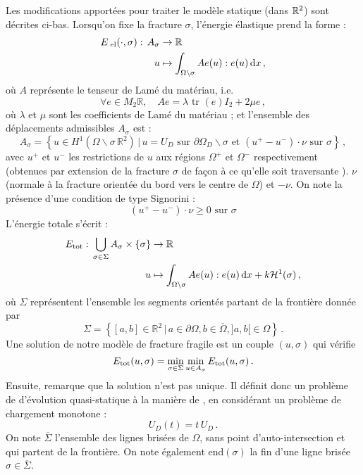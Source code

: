 Les modifications apportées pour traiter le modèle statique (dans $\mathbb{R}^2$) sont décrites ci-bas. Lorsqu'on fixe la fracture $\sigma$, l'énergie élastique prend la forme :
\begin{align*}
\eel (\cdot,\sigma): \, A_{\sigma} &\rightarrow \mathbb{R} \\
u &\mapsto \int_{\Omega \backslash \sigma} Ae(u) : e(u) \diff x \,,
\end{align*}
où $A$ représente le tenseur de Lamé du matériau, i.e.
$$
    \forall e \in M_2{\mathbb{R}}, \quad Ae = \lambda \text{ tr }(e)I_2 + 2\mu e \,,
$$ 
où $\lambda$ et $\mu$ sont les coefficients de Lamé du matériau ; et l'ensemble des déplacements admissibles $A_{\sigma}$ est :
$$
A_{\sigma} = \left\{  u \in H^1(\Omega \backslash \sigma \, \mathbb{R}^2) \, \rvert \, u=U_D \text{ sur } \partial \Omega_D \backslash \sigma \text{ et } (u^+ - u^{-}) \cdot \nu \text{ sur } \sigma \right\} \,,
$$
avec $u^{+}$ et $u^{−}$ les restrictions de $u$ aux régions $\Omega^{+}$ et $\Omega^{-}$ respectivement (obtenues par extension de la fracture $\sigma$ de façon à ce qu'elle soit traversante \parencite[p.52]{balasoiu2020halthesis}). $\nu$ (normale à la fracture orientée du bord vers le centre de $\Omega$) et $−\nu$. On note la présence d'une condition de type Signorini :
$$
(u^+ - u^{-}) \cdot \nu \geq 0 \text{  sur  } \sigma
$$
L'énergie totale s'écrit :
\begin{align*}
\etot : \,\bigcup_{\sigma \in \Sigma } A_{\sigma} \times \left\{ \sigma \right\} &\rightarrow \mathbb{R} \\
 u &\mapsto \int_{\Omega \backslash \sigma} Ae(u) : e(u) \diff x + k\mathcal{H}^1(\sigma)\,,
\end{align*}
où $\Sigma$ représentent l'ensemble les segments orientés partant de la frontière donnée par 
$$
\Sigma = \left\{ [a,b] \in \mathbb{R}^2 \, \lvert \, a \in \partial\Omega, b\in \overline{\Omega}, ]a,b[ \in \Omega\right\} \,.
$$
Une solution de notre modèle de fracture fragile est un couple $(u, \sigma)$ qui vérifie
$$
E_{\text{\upshape tot}}(u,\sigma) = \min_{\sigma \in \Sigma}{\min_{u\in A_{\sigma}}{E_{\text{\upshape tot}}(u,\sigma)}} \,.
$$
Ensuite, \citeauthor{balasoiu2020halthesis} remarque que la solution n'est pas unique. Il définit donc un problème de d'évolution quasi-statique à la manière de \parencite{francfort1998revisiting}, en considérant un problème de chargement monotone : 
$$
U_D(t) = t\, U_D \,.
$$
On note $\overline{\Sigma}$ l’ensemble des lignes brisées de $\Omega$, sans point d’auto-intersection et qui partent de la frontière. On note également $\text{end}(\sigma)$ la fin d’une ligne brisée $\sigma \in  \overline{\Sigma}$.
